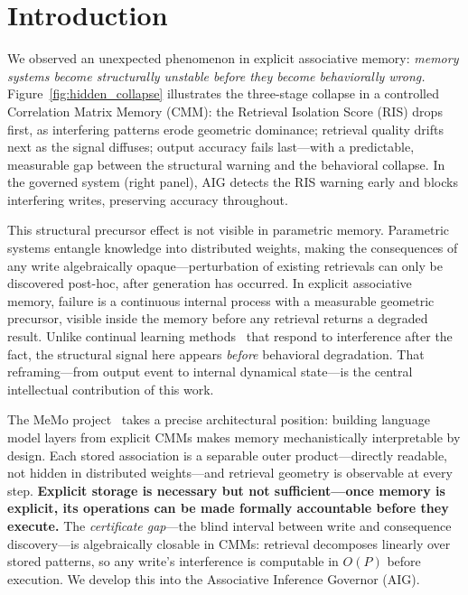 \documentclass{ceurart}
\begin{document}
\maketitle

\section{Introduction}
\label{sec:intro}

We observed an unexpected phenomenon in explicit associative memory:
\emph{memory systems become structurally unstable before they become behaviorally
wrong.}
Figure~\ref{fig:hidden_collapse} illustrates the three-stage collapse in a
controlled Correlation Matrix Memory (CMM): the Retrieval Isolation Score (RIS)
drops first, as interfering patterns erode geometric dominance; retrieval quality
drifts next as the signal diffuses; output accuracy fails last---with a
predictable, measurable gap between the structural warning and the behavioral
collapse. In the governed system (right panel), AIG detects the RIS warning early
and blocks interfering writes, preserving accuracy throughout.

This structural precursor effect is not visible in parametric memory.
Parametric systems entangle knowledge into distributed weights, making the
consequences of any write algebraically opaque---perturbation of existing
retrievals can only be discovered post-hoc, after generation has occurred.
In explicit associative memory, failure is a continuous internal process with a
measurable geometric precursor, visible inside the memory before any retrieval
returns a degraded result.
Unlike continual learning methods~\citep{kirkpatrick2017overcoming,
lopez2017gradient} that respond to interference after the fact,
the structural signal here appears \emph{before} behavioral degradation.
That reframing---from output event to internal dynamical state---is the central
intellectual contribution of this work.

The MeMo project~\citep{zanzotto2025memo} takes a precise architectural
position: building language model layers from explicit CMMs makes memory
mechanistically interpretable by design.
Each stored association is a separable outer product---directly readable, not
hidden in distributed weights---and retrieval geometry is observable at every step.
\textbf{Explicit storage is necessary but not sufficient---once memory is
explicit, its operations can be made formally accountable before they execute.}
The \emph{certificate gap}---the blind interval between write and consequence
discovery---is algebraically closable in CMMs: retrieval decomposes linearly
over stored patterns, so any write's interference is computable in $O(P)$
before execution.
We develop this into the Associative Inference Governor (AIG).
\end{document}
